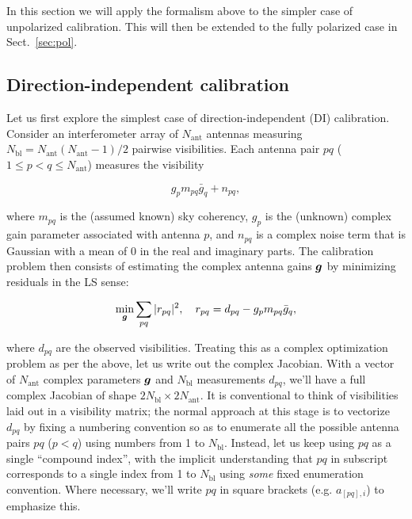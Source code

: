 \documentclass[useAMS,usenatbib]{mn2e}
\begin{document}
In this section we will apply the formalism above to the simpler case of unpolarized calibration. 
This will then be extended to the fully polarized case in Sect.~\ref{sec:pol}.

\subsection{Direction-independent calibration}
\label{sec:unpol:DI}

\newcommand{\Na}{N_\mathrm{ant}}
\newcommand{\Nbl}{N_\mathrm{bl}}
\newcommand{\Nd}{N_\mathrm{dir}}

Let us first explore the simplest case of direction-independent (DI) calibration. Consider an interferometer
array of $\Na$ antennas measuring $\Nbl=\Na(\Na-1)/2$ pairwise visibilities. Each antenna pair $pq$ ($1\leq p<q\leq \Na$) 
measures the visibility

\begin{equation}
\label{eq:RIME:unpol}
g_p m_{pq} \bar{g}_q + n_{pq},
\end{equation}

where $m_{pq}$ is the (assumed known) sky coherency, $g_p$ is the (unknown) complex gain parameter 
associated with antenna $p$, and $n_{pq}$ is a complex noise term that is Gaussian with a mean of 0 in the real and 
imaginary parts. The calibration problem then consists of estimating the complex antenna gains $\bmath{g}$ by
minimizing residuals in the LS sense:

\begin{equation}
\label{eq:cal:DI}
\min_{\bmath{g}}\sum_{pq}|r_{pq}|^2,~~~r_{pq}=d_{pq}-g_p m_{pq} \bar{g}_q, 
\end{equation}

where $d_{pq}$ are the observed visibilities. Treating this as a complex optimization problem as per the above, 
let us write out the complex Jacobian. 
With a vector of $\Na$ complex parameters $\bmath{g}$ and $\Nbl$ measurements $d_{pq}$, we'll have a full complex
Jacobian of shape $2\Nbl\times2\Na$. It is conventional
to think of visibilities laid out in a visibility matrix; the normal approach at this stage is to vectorize $d_{pq}$ 
by fixing a numbering convention so as to enumerate all the possible antenna pairs $pq$ ($p<q$) using numbers from 1 to $\Nbl$.
Instead, let us keep using $pq$ as a single ``compound index'', with the implicit understanding that $pq$ in 
subscript corresponds to a single index from 1 to $\Nbl$ using \emph{some} fixed enumeration convention. 
Where necessary, we'll write $pq$ in square brackets (e.g. $a_{[pq],i}$) to emphasize this.
\end{document}
